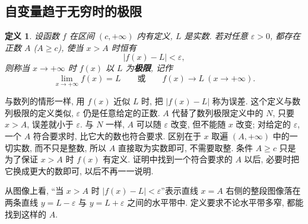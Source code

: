 \documentclass[UTF8,openany]{ctexbook}
\theoremstyle{chinesetextbook}
\newtheorem{definition}{定义}[section]
\begin{document}
\subsection{自变量趋于无穷时的极限}
\begin{definition}
设函数 $f$ 在区间 $(c,+\infty)$ 内有定义, $L$ 是实数. 若对任意 $\varepsilon>0$, 都存在正数 $A$ ($A\ge c$), 使当 $x>A$ 时恒有
\[
|f(x)-L|<\varepsilon,
\]
则称当 $x\to+\infty$ 时 $f(x)$ 以 $L$ 为\textbf{极限}, 记作
\[
\lim_{x\to+\infty}f(x)=L\qquad\text{或}\qquad f(x)\to L\ (x\to+\infty).
\]
\end{definition}
与数列的情形一样, 用 $f(x)$ 近似 $L$ 时, 把 $|f(x)-L|$ 称为误差. 这个定义与数列极限的定义类似, $\varepsilon$ 仍是任意给定的正数. $A$ 代替了数列极限定义中的 $N$, 只要 $x>A$, 误差就小于 $\varepsilon$. 与 $N$ 一样, $A$ 可以随 $\varepsilon$ 改变, 但不能随 $x$ 改变; 对给定的 $\varepsilon$, 一个 $A$ 符合要求时, 比它大的数也符合要求. 区别在于 $x$ 取遍 $(A,+\infty)$ 中的一切实数, 而不只是整数, 所以 $A$ 直接取为实数即可, 不需要取整. 条件 $A\ge c$ 只是为了保证 $x>A$ 时 $f(x)$ 有定义. 证明中找到一个符合要求的 $A$ 以后, 必要时把它换成更大的数即可, 以后不再一一说明.

从图像上看, “当 $x>A$ 时 $|f(x)-L|<\varepsilon$”表示直线 $x=A$ 右侧的整段图像落在两条直线 $y=L-\varepsilon$ 与 $y=L+\varepsilon$ 之间的水平带中. 定义要求不论水平带多窄, 都能找到这样的 $A$.
\end{document}
